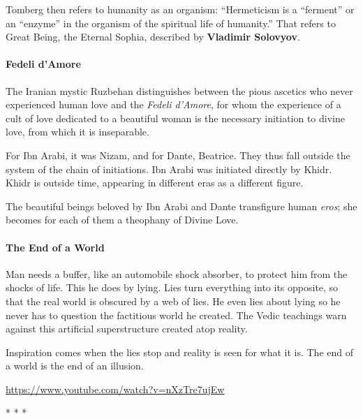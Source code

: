 Tomberg then refers to humanity as an organism: ``Hermeticism is a ``ferment'' or an ``enzyme'' in the organism of the spiritual life of humanity.'' That refers to Great Being, the Eternal Sophia, described by \textbf{Vladimir Solovyov}.


\paragraph{Fedeli d'Amore}


The Iranian mystic Ruzbehan distinguishes between the pious ascetics who never experienced human love and the \emph{Fedeli d'Amore}, for whom the experience of a cult of love dedicated to a beautiful woman is the necessary initiation to divine love, from which it is inseparable.

For Ibn Arabi, it was Nizam, and for Dante, Beatrice. They thus fall outside the system of the chain of initiations. Ibn Arabi was initiated directly by Khidr. Khidr is outside time, appearing in different eras as a different figure.

The beautiful beings beloved by Ibn Arabi and Dante transfigure human \emph{eros}; she becomes for each of them a theophany of Divine Love.


\paragraph{The End of a World}


Man needs a buffer, like an automobile shock absorber, to protect him from the shocks of life. This he does by lying. Lies turn everything into its opposite, so that the real world is obscured by a web of lies. He even lies about lying so he never has to question the factitious world he created. The Vedic teachings warn against this artificial superstructure created atop reality.

Inspiration comes when the lies stop and reality is seen for what it is. The end of a world is the end of an illusion.

\url{https://www.youtube.com/watch?v=nXzTre7ujEw} 


\begin{center}* * *\end{center}

